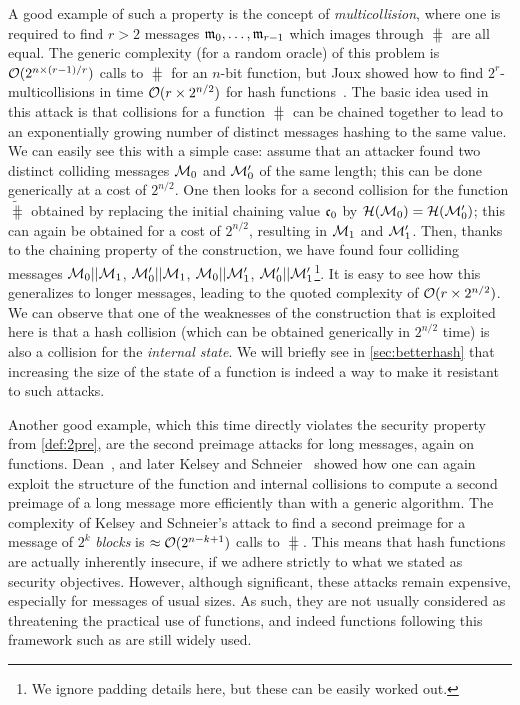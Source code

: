 A good example of such a property is the concept of \emph{multicollision}, where one is required to find $r > 2$ messages $\mathfrak{m}_{0},\ldots,\mathfrak{m}_{r-1}$ which images through $\hash$
are all equal. The generic complexity (\eg for a random oracle) of this problem is $\operatorname{\mathcal{O}}(2^{n\times (r-1)/r})$ calls to $\hash$ for an $n$-bit function, but Joux showed how to
find $2^r$-multicollisions in time $\operatorname{\mathcal{O}}(r\times 2^{n/2})$ for \merkdam hash functions~\cite{DBLP:conf/crypto/Joux04}.
The basic idea used in this attack is that collisions for a \merkdam function $\hash$ can be chained together to lead to an exponentially growing number of distinct messages hashing
to the same value. We can easily see this with a simple case: assume that an attacker found two distinct colliding messages $\mathcal{M}_0$ and $\mathcal{M}'_0$ of the same length;
this can be done generically at a cost of $2^{n/2}$. One then looks for a second collision for the function $\widetilde \hash$ obtained by replacing the initial chaining
value $\mathfrak{c}_0$ by $\operatorname{\mathcal{H}}(\mathcal{M}_0) = \operatorname{\mathcal{H}}(\mathcal{M}'_0)$; this can again be obtained for a cost of $2^{n/2}$, resulting in $\mathcal{M}_1$ and $\mathcal{M}'_1$. Then, thanks to
the chaining property of the \merkdam construction, we have found four colliding messages $\mathcal{M}_0||\mathcal{M}_1$, $\mathcal{M}'_0||\mathcal{M}_1$, $\mathcal{M}_0||\mathcal{M}'_1$, $\mathcal{M}'_0||\mathcal{M}'_1$\footnote{We ignore
padding details here, but these can be easily worked out.}. It is easy to see how this generalizes to longer messages, leading to the quoted complexity of $\operatorname{\mathcal{O}}(r \times 2^{n/2})$.
We can observe that one of the weaknesses of the construction that is exploited here is that a hash collision (which can be obtained generically in $2^{n/2}$ time) is also
a collision for the \emph{internal state}. We will briefly see in \autoref{sec:betterhash} that increasing the size of the state of a function is indeed a way to make it resistant
to such attacks.

Another good example, which this time directly violates the security property from \autoref{def:2pre}, are the second preimage attacks for long messages, again on \merkdam functions.
Dean~\cite{}, and later Kelsey and Schneier~\cite{} showed how one can again exploit the structure of the function and internal collisions to compute a second preimage
of a long message more efficiently than with a generic algorithm. The complexity of Kelsey and Schneier's attack to find a second preimage for a message
of $2^k$ \emph{blocks} is $\approx \operatorname{\mathcal{O}}(2^{n-k+1})$ calls to $\hash$. This means that \merkdam hash functions are actually inherently insecure, if we adhere
strictly to what we stated as security objectives. However, although significant, these attacks remain expensive, especially for messages of usual sizes. As such, they are not usually considered as threatening
the practical use of \merkdam functions, and indeed functions following this framework such as \shatwo are still widely used.

